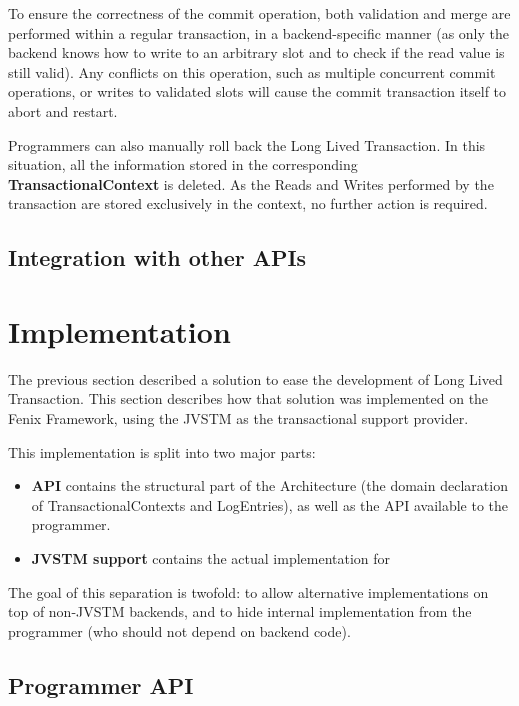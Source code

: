 To ensure the correctness of the commit operation, both validation and
merge are performed within a regular transaction, in a
backend-specific manner (as only the backend knows how to write to an
arbitrary slot and to check if the read value is still valid). Any
conflicts on this operation, such as multiple concurrent commit
operations, or writes to validated slots will cause the commit
transaction itself to abort and restart.

Programmers can also manually roll back the Long Lived Transaction. In
this situation, all the information stored in the corresponding {\bf
  TransactionalContext} is deleted. As the Reads and Writes performed
by the transaction are stored exclusively in the context, no further
action is required.

\subsection{Integration with other APIs}



\section{Implementation}
\label{sec:impl}

The previous section described a solution to ease the development of
Long Lived Transaction. This section describes how that solution was
implemented on the Fenix Framework, using the JVSTM as the
transactional support provider.

This implementation is split into two major parts:

\begin{itemize}

\item {\bf API} contains the structural part of the Architecture (the
  domain declaration of TransactionalContexts and LogEntries), as well
  as the API available to the programmer.

\item {\bf JVSTM support} contains the actual implementation for 

\end{itemize}

The goal of this separation is twofold: to allow alternative
implementations on top of non-JVSTM backends, and to hide internal
implementation from the programmer (who should not depend on backend
code).

\subsection{Programmer API}

